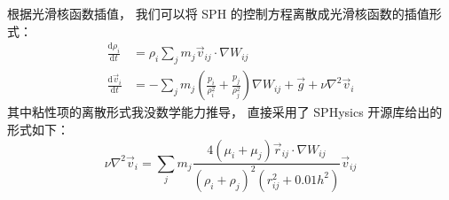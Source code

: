 \begin{frame}
    根据光滑核函数插值，
    我们可以将 SPH 的控制方程离散成光滑核函数的插值形式：
    \begin{equation}
        \begin{aligned}
            \frac{\mathrm{d} \rho_i}{\mathrm{d} t} &= \rho_i \sum_j m_j \vec{v}_{ij} \cdot \nabla W_{ij} \\
            \frac{\mathrm{d} \vec{v}_i}{\mathrm{d} t} &= -\sum_j m_j \left(\frac{p_i}{\rho_i^2} + \frac{p_j}{\rho_j^2}\right) \nabla W_{ij} + \vec{g} + \nu \nabla^2 \vec{v}_i
        \end{aligned}
    \end{equation}
    其中粘性项的离散形式我没数学能力推导，
    直接采用了 SPHysics 开源库给出的形式如下：
    \begin{equation}
        \nu \nabla^2 \vec{v}_i = 
        \sum_j m_j
        \frac{4 (\mu_i + \mu_j) \vec{r}_{ij}\cdot \nabla W_{ij}}{(\rho_i + \rho_j)^2 (r_{ij}^2 + 0.01h^2)}\vec{v}_{ij}
    \end{equation}
\end{frame}
